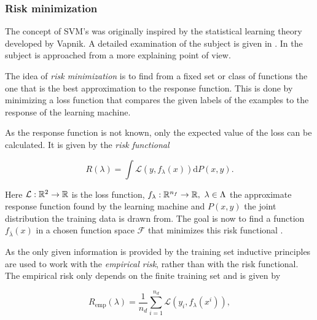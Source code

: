 \subsubsection{Risk minimization}
The concept of SVM's was originally inspired by the statistical learning theory developed by Vapnik. A detailed examination of the subject is given in \cite{Vapnik1998}. In \cite{Vapnik2013} the subject is approached from a more explaining point of view.

The idea of \emph{risk minimization} is to find from a fixed set or class of functions the one that is the best approximation to the response function. This is done by minimizing a loss function that compares the given labels of the examples to the response of the learning machine.

As the response function is not known, only the expected value of the loss can be calculated. It is given by the \emph{risk functional} 

\begin{equation}
	R(\lambda) = \int{\mathcal{L}(y,f_{\lambda}(x))\text{d}P(x,y)}.
\label{risk_func}
\end{equation}

Here \(\mathcal{L}: \mathbb{R}^2 \to \mathbb{R}\) is the loss function, \(f_{\lambda}: \mathbb{R}^{n_f} \to \mathbb{R}, ~ \lambda \in \Lambda\) the approximate response function found by the learning machine and \(P(x,y)\) the joint distribution the training data is drawn from. The goal is now to find a function \(f_{\bar{\lambda}}(x)\) in a chosen function space \(\mathcal{F}\) that minimizes this risk functional \cite[p. 989]{Vapnik1999}.

As the only given information is provided by the training set inductive principles are used to work with the \emph{empirical risk}, rather than with the risk functional.
The empirical risk only depends on the finite training set  and is given by 


\begin{equation}
	R_{\text{emp}}(\lambda) = \frac{1}{n_d} \sum_{i = 1}^{n_d}\mathcal{L}(y_i,f_{\lambda}(x^i)),
\label{emp_risk}
\end{equation}

